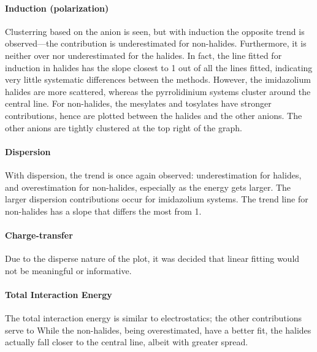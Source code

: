 \paragraph{Induction (polarization)}
Clusterring based on the anion is seen, but with induction the opposite trend is observed---the contribution is underestimated for non-halides.
Furthermore, it is neither over nor underestimated for the halides.
In fact, the line fitted for induction in halides has the slope closest to 1 out of all the lines fitted, indicating very little systematic differences between the methods.
However, the imidazolium halides are more scattered, whereas the pyrrolidinium systems cluster around the central line. 
For non-halides, the mesylates and tosylates have stronger contributions, hence are plotted between the halides and the other anions. 
The other anions are tightly clustered at the top right of the graph.

\paragraph{Dispersion}
With dispersion, the trend is once again observed: underestimation for halides, and overestimation for non-halides, especially as the energy gets larger.
The larger dispersion contributions occur for imidazolium systems.
The trend line for non-halides has a slope that differs the most from 1.

\paragraph{Charge-transfer}
Due to the disperse nature of the plot, it was decided that linear fitting would not be meaningful or informative.

\paragraph{Total Interaction Energy}
The total interaction energy is similar to electrostatics; the other contributions serve to 
While the non-halides, being overestimated, have a better fit, the halides actually fall closer to the central line, albeit with greater spread.

